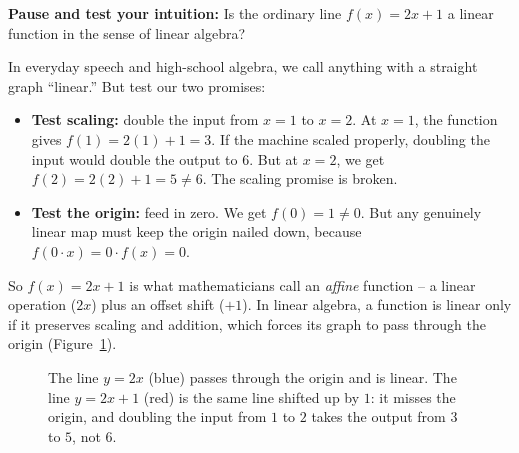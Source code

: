 \begin{recoverybox}
\textbf{Pause and test your intuition:} Is the ordinary line $f(x) = 2x + 1$ a linear function in the sense
of linear algebra?

In everyday speech and high-school algebra, we call anything with a straight graph ``linear.'' But test our
two promises:
\begin{itemize}
  \item \textbf{Test scaling:} double the input from $x=1$ to $x=2$. At $x=1$, the function gives $f(1) = 2(1)+1 = 3$.
  If the machine scaled properly, doubling the input would double the output to $6$. But at $x=2$, we get
  $f(2) = 2(2)+1 = 5 \neq 6$. The scaling promise is broken.
  \item \textbf{Test the origin:} feed in zero. We get $f(0) = 1 \neq 0$. But any genuinely linear map must keep
  the origin nailed down, because $f(0\cdot x) = 0\cdot f(x) = 0$.
\end{itemize}
So $f(x) = 2x+1$ is what mathematicians call an \emph{affine} function -- a linear operation ($2x$) plus an
offset shift ($+1$). In linear algebra, a function is linear only if it preserves scaling and addition, which
forces its graph to pass through the origin (Figure~\ref{ch01:affine}).
\end{recoverybox}

\begin{figure}[htbp]
\centering
{}
\caption{The line $y=2x$ (blue) passes through the origin and is linear. The line $y=2x+1$ (red) is the
same line shifted up by $1$: it misses the origin, and doubling the input from $1$ to $2$ takes the
output from $3$ to $5$, not $6$.}
\label{ch01:affine}
\end{figure}

